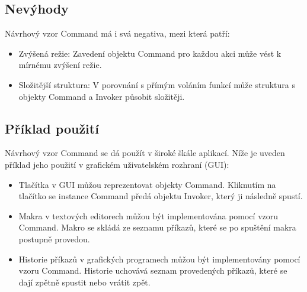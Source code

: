 \documentclass{article}
\begin{document}
\begin{Návrhový vzor - Command}
        \subsection{Nevýhody}

        Návrhový vzor Command má i svá negativa, mezi která patří:

        \begin{itemize}
            \item Zvýšená režie: Zavedení objektu Command pro každou akci může vést k mírnému zvýšení režie.
            \item Složitější struktura: V porovnání s přímým voláním funkcí může struktura s objekty Command a Invoker působit složitěji.
        \end{itemize}

        \subsection{Příklad použití}

        Návrhový vzor Command se dá použít v široké škále aplikací.
        Níže je uveden příklad jeho použití v grafickém uživatelském rozhraní (GUI):

        \begin{itemize}
            \item Tlačítka v GUI můžou reprezentovat objekty Command.
            Kliknutím na tlačítko se instance Command předá objektu Invoker, který ji následně spustí.
            \item Makra v textových editorech můžou být implementována pomocí vzoru Command.
            Makro se skládá ze seznamu příkazů, které se po spuštění makra postupně provedou.
            \item Historie příkazů v grafických programech můžou být implementovány pomocí vzoru Command.
            Historie uchovává seznam provedených příkazů, které se dají zpětně spustit nebo vrátit zpět.
        \end{itemize}
    \end{Návrhový vzor - Command}
\end{document}
